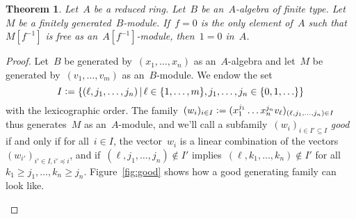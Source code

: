 \documentclass{amsart}
\theoremstyle{definition}
\theoremstyle{plain}
\newtheorem{thm}[defn]{Theorem}
\theoremstyle{remark}
\newcommand{\defeq}{\vcentcolon=}
\begin{document}
\begin{thm}Let~$A$ be a reduced ring. Let~$B$ be an~$A$-algebra of finite type.
Let~$M$ be a finitely generated~$B$-module. If~$f = 0$ is the only element
of~$A$ such that~$M[f^{-1}]$ is free as an~$A[f^{-1}]$-module, then~$1 = 0$
in~$A$.\end{thm}

\begin{proof}Let~$B$ be generated by~$(x_1,\ldots,x_n)$ as an~$A$-algebra and
let~$M$ be generated by~$(v_1,\ldots,v_m)$ as an~$B$-module. We endow the set
\[ I \defeq \{ (\ell, j_1,\ldots,j_n) \,|\,
  \ell \in \{ 1,\ldots,m \},
  j_1,\ldots,j_n \in \{ 0,1,\ldots \} \} \]
with the lexicographic order. The family~$(w_i)_{i \in I} \defeq (x_1^{j_1}
\ldots x_n^{j_n} v_\ell)_{(\ell,j_1,\ldots,j_n) \in I}$ thus generates~$M$ as
an~$A$-module, and we'll call a subfamily~$(w_i)_{i \in I' \subseteq I}$
\emph{good} if and only if for all~$i \in I$, the vector~$w_i$ is a linear
combination of the vectors~$(w_{i'})_{i' \in I, i' \preceq i}$,
and if~$(\ell,j_1,\ldots,j_n) \not\in I'$ implies~$(\ell,k_1,\ldots,k_n) \not\in
I'$ for all~$k_1 \geq j_1, \ldots, k_n \geq j_n$. Figure~\ref{fig:good} shows
how a good generating family can look like.

\begin{figure}
\end{figure}
\end{proof}
\end{document}
